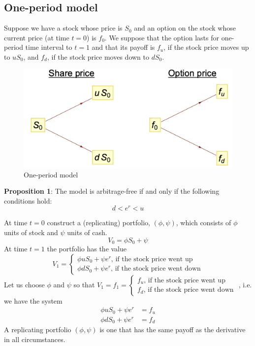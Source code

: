 \documentclass[11pt,a4paper]{book}
\theoremstyle{definition}\newtheorem{definition}{Definition}
\theoremstyle{definition}\newtheorem{fact}{Fact}
\theoremstyle{definition}\newtheorem{remark}{Remark}
\theoremstyle{definition}\newtheorem{ex}{Ex.}
\theoremstyle{definition}\newtheorem{project}{Project}
\theoremstyle{definition}\newtheorem{problem}{Problem}
\theoremstyle{definition}\newtheorem{example}{Example}
\numberwithin{theorem}{section}
\numberwithin{corollary}{chapter}
\numberwithin{assumption}{chapter}
\numberwithin{definition}{chapter}
\numberwithin{prop}{chapter}
\numberwithin{notation}{chapter}
\numberwithin{problem}{chapter}
\numberwithin{example}{chapter}
\numberwithin{fact}{chapter}
\numberwithin{ex}{chapter}
\begin{document}
\subsection{One-period model}
Suppose we have a stock whose price is $S_0$ and an option on the stock whose current price (at time $t=0$) is $f_0$. We suppose that the option lasts for one-period time interval to $t=1$ and that its payoff is $f_u$, if the stock price moves up to $u S_0$, and $f_d$, if the stock price moves down to $d S_0$.

\begin{figure}[H]
	\centering
	\includegraphics[scale=0.5]{Chapter04/Chapter4_1.png}
	\caption{One-period model}
\end{figure}

\textbf{Proposition 1}: The model is arbitrage-free if and only if the following conditions hold:
\begin{equation}
d < e^r < u
\end{equation}

At time $t=0$ construct a (replicating) portfolio, $(\phi,\psi)$, which consists of $\phi$ units of stock and $\psi$ units of cash.
$$ V_0 = \phi S_0 + \psi $$
At time $t=1$ the portfolio has the value
$$ V_1 = \begin{cases}
\phi u S_0 + \psi e^r \text{,     if the stock price went up} \\
\phi d S_0 + \psi e^r \text{,     if the stock price went down}
\end{cases} $$
Let us choose $\phi$ and $\psi$ so that $V_1 = f_1 = \begin{cases}
f_u \text{,     if the stock price went up} \\
f_d \text{,     if the stock price went down}
\end{cases}$
, i.e. we have the system
\begin{align}
\phi u S_0 + \psi e^r &= f_u \nonumber \\
\phi d S_0 + \psi e^r &= f_d
\end{align}
A replicating portfolio $(\phi, \psi)$ is one that has the same payoff as the derivative in all circumstances.
\end{document}

